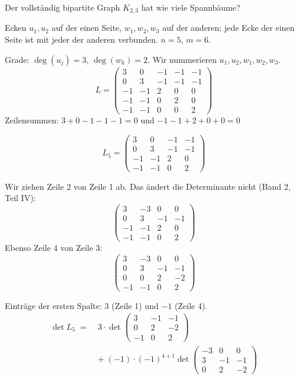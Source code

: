 \begin{aufgabe}
Der vollständig bipartite Graph $K_{2,3}$ hat wie viele Spannbäume?

\loesung
{}
Ecken $u_1, u_2$ auf der einen Seite, $w_1, w_2, w_3$ auf der anderen; jede Ecke der einen Seite ist mit jeder der anderen verbunden. $n = 5$, $m = 6$.

Grade: $\deg(u_j) = 3$, $\deg(w_k) = 2$. Wir nummerieren $u_1, u_2, w_1, w_2, w_3$.
\[ L = \begin{pmatrix}
3 & 0 & -1 & -1 & -1\\
0 & 3 & -1 & -1 & -1\\
-1 & -1 & 2 & 0 & 0\\
-1 & -1 & 0 & 2 & 0\\
-1 & -1 & 0 & 0 & 2
\end{pmatrix} \]
Zeilensummen: $3+0-1-1-1 = 0$ \checkmark und $-1-1+2+0+0 = 0$ \checkmark

\[ L_5 = \begin{pmatrix}
3 & 0 & -1 & -1\\
0 & 3 & -1 & -1\\
-1 & -1 & 2 & 0\\
-1 & -1 & 0 & 2
\end{pmatrix} \]

Wir ziehen Zeile 2 von Zeile 1 ab. Das ändert die Determinante nicht (Band 2, Teil IV):
\[ \begin{pmatrix}
3 & -3 & 0 & 0\\
0 & 3 & -1 & -1\\
-1 & -1 & 2 & 0\\
-1 & -1 & 0 & 2
\end{pmatrix} \]
Ebenso Zeile 4 von Zeile 3:
\[ \begin{pmatrix}
3 & -3 & 0 & 0\\
0 & 3 & -1 & -1\\
0 & 0 & 2 & -2\\
-1 & -1 & 0 & 2
\end{pmatrix} \]

Einträge der ersten Spalte: $3$ (Zeile 1) und $-1$ (Zeile 4).
\begin{align*}
\det L_5 \;=\;& 3 \cdot \det\!\begin{pmatrix} 3 & -1 & -1\\ 0 & 2 & -2\\ -1 & 0 & 2\end{pmatrix}\\[3pt]
&+\; (-1)\cdot(-1)^{4+1}\det\!\begin{pmatrix} -3 & 0 & 0\\ 3 & -1 & -1\\ 0 & 2 & -2 \end{pmatrix}
\end{align*}


\end{aufgabe}
